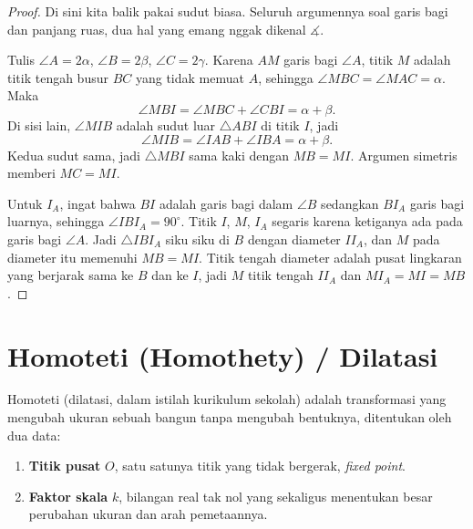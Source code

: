 \documentclass[letterpaper, 13pt]{scrartcl}
\begin{document}
\begin{proof}
Di sini kita balik pakai sudut biasa. Seluruh argumennya soal garis bagi dan panjang ruas, dua hal yang emang nggak dikenal $\measuredangle$.

Tulis $\angle A = 2\alpha$, $\angle B = 2\beta$, $\angle C = 2\gamma$. Karena $AM$ garis bagi $\angle A$, titik $M$ adalah titik tengah busur $BC$ yang tidak memuat $A$, sehingga $\angle MBC = \angle MAC = \alpha$. Maka
\[
\angle MBI = \angle MBC + \angle CBI = \alpha + \beta.
\]
Di sisi lain, $\angle MIB$ adalah sudut luar $\triangle ABI$ di titik $I$, jadi
\[
\angle MIB = \angle IAB + \angle IBA = \alpha + \beta.
\]
Kedua sudut sama, jadi $\triangle MBI$ sama kaki dengan $MB = MI$. Argumen simetris memberi $MC = MI$.

Untuk $I_A$, ingat bahwa $BI$ adalah garis bagi dalam $\angle B$ sedangkan $BI_A$ garis bagi luarnya, sehingga $\angle IBI_A = 90^\circ$. Titik $I$, $M$, $I_A$ segaris karena ketiganya ada pada garis bagi $\angle A$. Jadi $\triangle IBI_A$ siku siku di $B$ dengan diameter $II_A$, dan $M$ pada diameter itu memenuhi $MB = MI$. Titik tengah diameter adalah pusat lingkaran yang berjarak sama ke $B$ dan ke $I$, jadi $M$ titik tengah $II_A$ dan $MI_A = MI = MB$.
\end{proof}

\section{Homoteti (Homothety) / Dilatasi}

Homoteti (dilatasi, dalam istilah kurikulum sekolah) adalah transformasi yang mengubah ukuran sebuah bangun tanpa mengubah bentuknya, ditentukan oleh dua data:
\begin{enumerate}
  \item \textbf{Titik pusat} $O$, satu satunya titik yang tidak bergerak, \textit{fixed point}.
  \item \textbf{Faktor skala} $k$, bilangan real tak nol yang sekaligus menentukan besar perubahan ukuran dan arah pemetaannya.
\end{enumerate}
\end{document}
